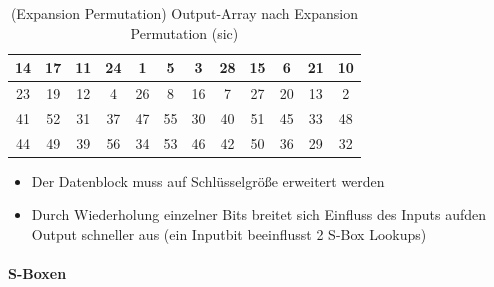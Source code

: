 \begin{table}[h]
    \centering
    \begin{tabular}{|*{12}{c|}}
        \hline
        \cellcolor{orange-1}14 & \cellcolor{yellow-1}17 & \cellcolor{orange-1}11 & \cellcolor{yellow-1}24 & 
        \cellcolor{red-1}1 & \cellcolor{red-1}5 & \cellcolor{red-1}3 & \cellcolor{green-1}28 &
        \cellcolor{orange-1}15 & \cellcolor{red-1}6 & \cellcolor{yellow-1}21 & \cellcolor{orange-1}10 \\
        \hline 
        
        \cellcolor{yellow-1}23 & \cellcolor{yellow-1}19 & \cellcolor{orange-1}12 & \cellcolor{red-1}4 & 
        \cellcolor{green-1}26 & \cellcolor{red-1}8 & \cellcolor{orange-1}16 & \cellcolor{red-1}7 & 
        \cellcolor{green-1}27 & \cellcolor{yellow-1}20 & \cellcolor{orange-1}13 & \cellcolor{red-1}2 \\
        \hline

        
        \cellcolor{blue-1}41 & \cellcolor{purple-1}52 & \cellcolor{green-1}31 & \cellcolor{cyan-1}37 & 
        \cellcolor{blue-1}47 & \cellcolor{purple-1}55 & \cellcolor{green-1}30 & \cellcolor{cyan-1}40 & 
        \cellcolor{purple-1}51 & \cellcolor{blue-1}45 & \cellcolor{cyan-1}33 & \cellcolor{blue-1}48 \\
        \hline

        \cellcolor{blue-1}44 & \cellcolor{purple-1}49 & \cellcolor{cyan-1}39 & \cellcolor{purple-1}56 &
        \cellcolor{cyan-1}34 & \cellcolor{purple-1}53 & \cellcolor{blue-1}46 & \cellcolor{blue-1}42 &
        \cellcolor{purple-1}50 & \cellcolor{cyan-1}36 & \cellcolor{green-1}29 & \cellcolor{green-1}32 \\
        \hline 
    \end{tabular}
    \caption{(Expansion Permutation) Output-Array nach Expansion Permutation (sic)}
\end{table}

\begin{itemize}
    \item Der Datenblock muss auf Schlüsselgröße erweitert werden
    \item Durch Wiederholung einzelner Bits breitet sich Einfluss des Inputs aufden Output schneller aus (ein Inputbit beeinflusst 2 S-Box Lookups)
\end{itemize}

\paragraph{S-Boxen}

